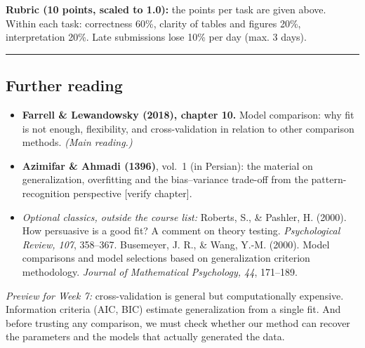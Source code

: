 \textbf{Rubric (10 points, scaled to 1.0):} the points per task are
given above. Within each task: correctness 60\%, clarity of tables and
figures 20\%, interpretation 20\%. Late submissions lose 10\% per day
(max. 3 days).

\begin{center}\rule{0.5\linewidth}{0.5pt}\end{center}

\subsection{Further reading}

\begin{itemize}
\tightlist
\item
  \textbf{Farrell \& Lewandowsky (2018), chapter 10.} Model comparison:
  why fit is not enough, flexibility, and cross-validation in relation
  to other comparison methods. \emph{(Main reading.)}
\item
  \textbf{Azimifar \& Ahmadi (1396)}, vol.~1 (in Persian): the material
  on generalization, overfitting and the bias--variance trade-off from
  the pattern-recognition perspective {[}verify chapter{]}.
\item
  \emph{Optional classics, outside the course list:} Roberts, S., \&
  Pashler, H. (2000). How persuasive is a good fit? A comment on theory
  testing. \emph{Psychological Review, 107}, 358--367. Busemeyer, J. R.,
  \& Wang, Y.-M. (2000). Model comparisons and model selections based on
  generalization criterion methodology. \emph{Journal of Mathematical
  Psychology, 44}, 171--189.
\end{itemize}

\emph{Preview for Week 7:} cross-validation is general but
computationally expensive. Information criteria (AIC, BIC) estimate
generalization from a single fit. And before trusting any comparison, we
must check whether our method can recover the parameters and the models
that actually generated the data.
